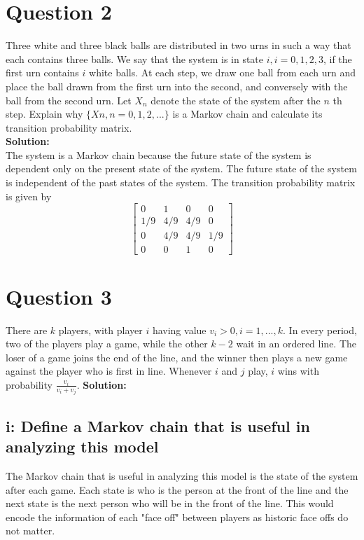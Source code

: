 \documentclass{article}
\begin{document}
\section*{Question 2}
Three white and three black balls are distributed in two urns in such a way
that each contains three balls. We say that the system is in state $i, i = 0, 1, 2, 3$, if the first urn
contains $i$ white balls. At each step, we draw one ball from each urn and place the ball drawn from
the first urn into the second, and conversely with the ball from the second urn. Let $X_n$ denote the
state of the system after the $n$
th step. Explain why $\{Xn, n = 0, 1, 2, . . . \}$ is a Markov chain and
calculate its transition probability matrix.\\
\textbf{Solution:}\\

The system is a Markov chain because the future state of the system is dependent only on the present state of the system. The future state of the system is independent of the past states of the system. The transition probability matrix is given by
$$ \begin{bmatrix}
    0 & 1 & 0 & 0\\
    1/9 & 4/9 & 4/9 & 0\\
    0 & 4/9 & 4/9 & 1/9\\
    0 & 0 & 1 & 0
\end{bmatrix}$$

\section*{Question 3}
There are $k$ players, with player $i$ having value $v_i > 0, i = 1, . . . , k$. In
every period, two of the players play a game, while the other $k-2$ wait in an
ordered line. The loser of a game joins the end of the line, and the winner then
plays a new game against the player who is first in line. Whenever $i$ and $j$ play,
$i$ wins with probability $\frac{v_i}{v_i + v_j}$. 
\textbf{Solution:}\\
\subsection*{i: Define a Markov chain that is useful in analyzing this model}

The Markov chain that is useful in analyzing this model is the state of the system after each game. Each state is who is the person at the front of the line and the next state is the next person who will be in the front of the line. This would encode the information of each "face off" between players as historic face offs do not matter.
\end{document}
